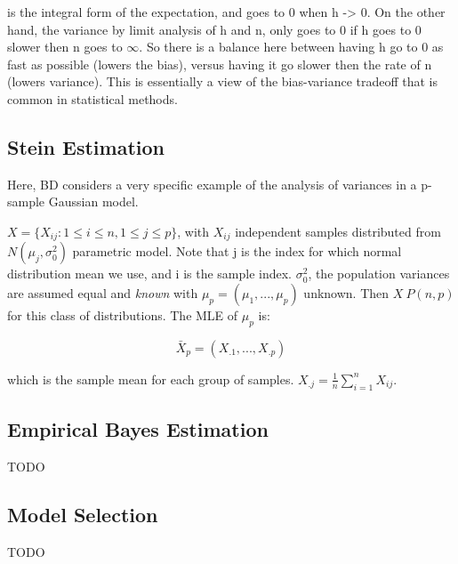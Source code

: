 		is the integral form of the expectation, and goes to 0 when h -> 0. On the other hand, the variance by limit analysis of h and n, only goes to 0 if h goes to 0 slower then n goes to $\infty$. So there is a balance here between having h go to 0 as fast as possible (lowers the bias), versus having it go slower then the rate of n (lowers variance). This is essentially a view of the bias-variance tradeoff that is common in statistical methods.

	\subsection{Stein Estimation}

		Here, BD considers a very specific example of the analysis of variances in a p-sample Gaussian model.

		$X = \{X_{ij} : 1 \le i \le n, 1 \le j \le p\}$, with $X_{ij}$ independent samples distributed from $N(\mu_j, \sigma_0^2)$ parametric model. Note that j is the index for which normal distribution mean we use, and i is the sample index. $\sigma_0^2$, the population variances are assumed equal and \textit{known} with $\mu_p = (\mu_1, ..., \mu_p)$ unknown. Then $X ~ P(n,p)$ for this class of distributions. The MLE of $\mu_p$ is:

			$$\bar{X}_p = (X_{.1}, ..., X_{.p})$$

		which is the sample mean for each group of samples. $X_{.j} = \frac{1}{n} \sum_{i=1}^n X_{ij}$. 
		
	\subsection{Empirical Bayes Estimation}

		TODO

	\subsection{Model Selection}
  		
  		TODO
